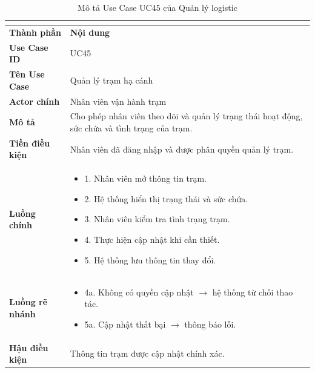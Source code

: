 \begin{longtable}{|C{3cm}|L{11cm}|}
\caption{Mô tả Use Case UC45 của Quản lý logistic}\\
\label{tab:mo-ta-uc45-quan-ly-logistic}\\
\hline
\textbf{Thành phần} & \textbf{Nội dung} \\
\hline
\textbf{Use Case ID} & UC45 \\
\hline
\textbf{Tên Use Case} & Quản lý trạm hạ cánh \\
\hline
\textbf{Actor chính} & Nhân viên vận hành trạm \\
\hline
\textbf{Mô tả} & Cho phép nhân viên theo dõi và quản lý trạng thái hoạt động, sức chứa và tình trạng của trạm. \\
\hline
\textbf{Tiền điều kiện} & Nhân viên đã đăng nhập và được phân quyền quản lý trạm. \\
\hline
\textbf{Luồng chính} &
\begin{itemize}[leftmargin=*,topsep=2pt,itemsep=2pt]
    \item 1. Nhân viên mở thông tin trạm.
    \item 2. Hệ thống hiển thị trạng thái và sức chứa.
    \item 3. Nhân viên kiểm tra tình trạng trạm.
    \item 4. Thực hiện cập nhật khi cần thiết.
    \item 5. Hệ thống lưu thông tin thay đổi.
\end{itemize} \\
\hline
\textbf{Luồng rẽ nhánh} &
\begin{itemize}[leftmargin=*,topsep=2pt,itemsep=2pt]
    \item 4a. Không có quyền cập nhật $\rightarrow$ hệ thống từ chối thao tác.
    \item 5a. Cập nhật thất bại $\rightarrow$ thông báo lỗi.
\end{itemize} \\
\hline
\textbf{Hậu điều kiện} & Thông tin trạm được cập nhật chính xác. \\
\hline
\end{longtable}


